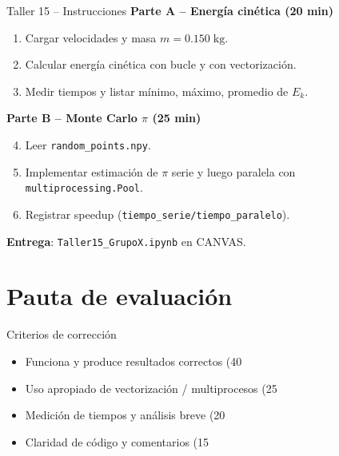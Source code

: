 \documentclass[10pt]{beamer}
\begin{document}
\begin{frame}{Taller 15 -- Instrucciones}
\textbf{Parte A -- Energía cinética (20 min)}
\begin{enumerate}
  \item Cargar velocidades y masa \(m=0.150\;\text{kg}\).  
  \item Calcular energía cinética con bucle y con vectorización.  
  \item Medir tiempos y listar mínimo, máximo, promedio de \(E_k\).
\end{enumerate}

\textbf{Parte B -- Monte Carlo \(\pi\) (25 min)}
\begin{enumerate}
  \setcounter{enumi}{3}
  \item Leer \texttt{random\_points.npy}.  
  \item Implementar estimación de \(\pi\) serie y luego paralela con \texttt{multiprocessing.Pool}.  
  \item Registrar speedup (\texttt{tiempo\_serie/tiempo\_paralelo}).  
\end{enumerate}

\textbf{Entrega}: \texttt{Taller15\_GrupoX.ipynb} en CANVAS.
\end{frame}

\section{Pauta de evaluación}
\begin{frame}{Criterios de corrección}
\begin{itemize}
  \item Funciona y produce resultados correctos (40 %
  \item Uso apropiado de vectorización / multiprocesos (25 %
  \item Medición de tiempos y análisis breve (20 %
  \item Claridad de código y comentarios (15 %
\end{itemize}
\end{frame}

\end{document}
